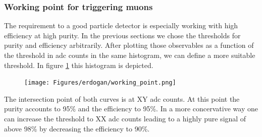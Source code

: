 		\subsubsection{Working point for triggering muons}
		\label{working_point}
			The requirement to a good particle detector is especially working with high efficiency at high purity.
			In the previous sections we chose the thresholds for purity and efficiency arbitrarily.
			After plotting those observables as a function of the threshold in adc counts in the same histogram, we can define a more suitable threshold.
			In figure \ref{fig:working_point} this histogram is depicted.
			\begin{figure}[htbp]
				\centering
				\texttt{[image: Figures/erdogan/working\_point.png]}
				\caption{}
				\label{fig:working_point}
			\end{figure}
			The intersection point of both curves is at XY adc counts.
			At this point the purity accounts to 95\% and the efficiency to 95\%.
			In a more concervative way one can increase the threshold to XX adc counts leading to a highly pure signal of above 98\% by decreasing the efficiency to 90\%.
